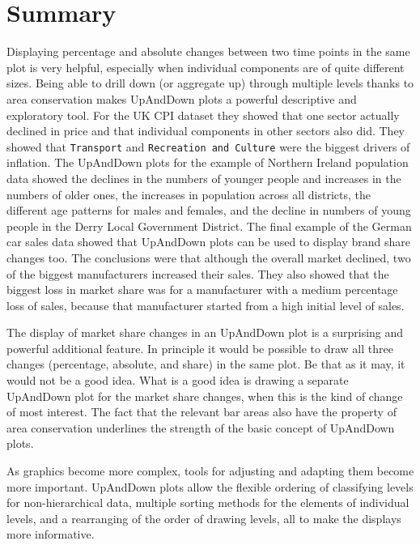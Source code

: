 \hypertarget{summary}{%
\section{Summary}\label{summary}}

Displaying percentage and absolute changes between two time points in the same plot is very helpful, especially when individual components are of quite different sizes. Being able to drill down (or aggregate up) through multiple levels thanks to area conservation makes UpAndDown plots a powerful descriptive and exploratory tool. For the UK CPI dataset they showed that one sector actually declined in price and that individual components in other sectors also did. They showed that \texttt{Transport} and \texttt{Recreation\ and\ Culture} were the biggest drivers of inflation. The UpAndDown plots for the example of Northern Ireland population data showed the declines in the numbers of younger people and increases in the numbers of older ones, the increases in population across all districts, the different age patterns for males and females, and the decline in numbers of young people in the Derry Local Government District. The final example of the German car sales data showed that UpAndDown plots can be used to display brand share changes too. The conclusions were that although the overall market declined, two of the biggest manufacturers increased their sales. They also showed that the biggest loss in market share was for a manufacturer with a medium percentage loss of sales, because that manufacturer started from a high initial level of sales.

The display of market share changes in an UpAndDown plot is a surprising and powerful additional feature. In principle it would be possible to draw all three changes (percentage, absolute, and share) in the same plot. Be that as it may, it would not be a good idea. What is a good idea is drawing a separate UpAndDown plot for the market share changes, when this is the kind of change of most interest. The fact that the relevant bar areas also have the property of area conservation underlines the strength of the basic concept of UpAndDown plots.

As graphics become more complex, tools for adjusting and adapting them become more important. UpAndDown plots allow the flexible ordering of classifying levels for non-hierarchical data, multiple sorting methods for the elements of individual levels, and a rearranging of the order of drawing levels, all to make the displays more informative.

